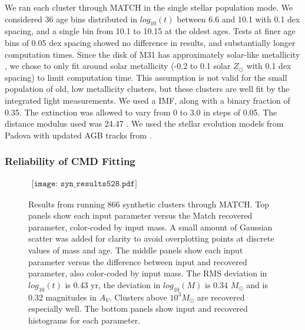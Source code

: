 \documentclass{emulateapj}
\begin{document}
We ran each cluster through MATCH in the single stellar population mode.  We considered 36 age bins distributed in $log_{10} (t)$ between 6.6 and 10.1 with 0.1 dex spacing, and a single bin from 10.1 to 10.15 at the oldest ages.  Tests at finer age bins of 0.05 dex spacing showed no difference in results, and substantially longer computation times.  Since the disk of M31 has approximately solar-like metallicity \citep[e.g.,][] {Sanders12, Zurita12}, we chose to only fit around solar metallicity (-0.2 to 0.1 solar $Z_{\odot}$ with 0.1 dex spacing) to limit computation time.  This assumption is not valid for the small population of old, low metallicity clusters, but these clusters are well fit by the integrated light measurements.  We used a \citet{Kroupa01} IMF, along with a binary fraction of 0.35.  The extinction was allowed to vary from 0 to 3.0 in steps of 0.05.  The distance modulus used was 24.47 \citep{McConnachie05}.  We used the stellar evolution models from Padova \citep{Marigo08} with updated AGB tracks from \cite{Girardi10}.








\subsubsection{Reliability of CMD Fitting} \label{sec:synthetic}


\begin{figure*}[!htbp]
   \begin{center}$
      \begin{array}{cc}
         \texttt{[image: syn\_results528.pdf]} 
      \end{array}$
   \end{center}
  \caption{Results from running 866 synthetic clusters through MATCH.  Top panels show each input parameter versus the Match recovered parameter, color-coded by input mass.  A small amount of Gaussian scatter was added for clarity to avoid overplotting points at discrete values of mass and age.  The middle panels show each input parameter versus the difference between input and recovered parameter, also color-coded by input mass.  The RMS deviation in $log_{10} (t)$ is 0.43 yr, the deviation in $log_{10} (M)$ is 0.34 $M_{\odot}$ and is 0.32 magnitudes in $A_{V}$.  Clusters above $10^3 M_{\odot}$ are recovered especially well.  The bottom panels show input and recovered histograms for each parameter.}
  \label{fig:synthetic}
\end{figure*}
\end{document}
